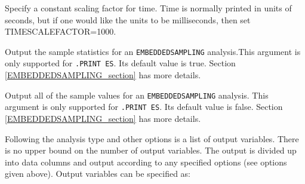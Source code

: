 \begin{Command}
\begin{Arguments}

Specify a constant scaling factor for time.  Time is normally printed in
units of seconds, but if one would like the units to be milliseconds,
then set TIMESCALEFACTOR=1000.

Output the sample statistics for an \texttt{EMBEDDEDSAMPLING}
analysis.This argument is only supported for \texttt{.PRINT ES}.
Its default value is true.  Section \ref{EMBEDDEDSAMPLING_section}
has more details.

Output all of the sample values for an \texttt{EMBEDDEDSAMPLING}
analysis.  This argument is only supported for \texttt{.PRINT ES}.
Its default value is false.  Section \ref{EMBEDDEDSAMPLING_section}
has more details.


Following the analysis type and other options is a list of output
variables. There is no upper bound on the number of output variables.
The output is divided up into data columns and output according to any
specified options (see options given above).  Output variables can be
specified as:


\end{Arguments}
\end{Command}
